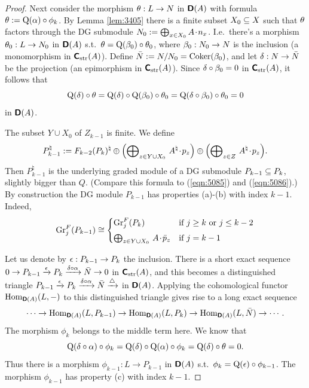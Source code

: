 \begin{proof}
Next consider the morphism
$\theta : L \to N$ in $\boldsymbol{\mathsf{D}}(A)$ with formula 
$\theta := \operatorname{Q}(\alpha) \circ \phi_k$.
By Lemma \ref{lem:3405} there is a finite subset $X_0 
\subseteq X$ such that $\theta$ factors through the DG submodule
$N_0 := \bigoplus\nolimits_{x \in X_0} A \mspace{1.5mu}{\cdot}\mspace{1.5mu} n_x$. 
I.e.\ there's a morphism $\theta_0 : L \to N_0$ in $\boldsymbol{\mathsf{D}}(A)$
s.t.\ $\theta = \operatorname{Q}(\beta_0) \circ \theta_0$, where 
$\beta_0 : N_0 \to N$ is the inclusion (a monomorphism in 
$\boldsymbol{\mathsf{C}}_{\mathrm{str}}(A)$). Define 
$\bar{N} := N / N_0 = \operatorname{Coker}(\beta_0)$,
and let $\delta : N \to \bar{N}$ be the projection
(an epimorphism in $\boldsymbol{\mathsf{C}}_{\mathrm{str}}(A)$). 
Since $\delta \circ \beta_0 = 0$ in $\boldsymbol{\mathsf{C}}_{\mathrm{str}}(A)$, 
it follows that 
\[ \operatorname{Q}(\delta) \circ \theta = \operatorname{Q}(\delta) \circ \operatorname{Q}(\beta_0) \circ \theta_0 = 
\operatorname{Q}(\delta \circ \beta_0) \circ \theta_0 = 0 \]
in $\boldsymbol{\mathsf{D}}(A)$. 

The subset $Y \cup X_0$ of $Z_{k - 1}$ is finite. 
We define 
\begin{equation} \label{eqn:3415}
P_{k - 1}^{\natural} := F_{k - 2}(P_k)^{\natural} \oplus
\Bigl( \bigoplus\nolimits_{z \in Y \cup X_0} \, A^{\natural}\mspace{1.5mu}{\cdot}\mspace{1.5mu} p_z \Bigr) 
\oplus \Bigl( \bigoplus\nolimits_{z \in Z} \, A^{\natural} \mspace{1.5mu}{\cdot}\mspace{1.5mu} p_z \Bigr) . 
\end{equation}
Then $P_{k - 1}^{\natural}$ is the underlying graded module of a DG submodule 
$P_{k - 1} \subseteq P_k$, slightly bigger than $Q$.
(Compare this formula to (\ref{eqn:5085}) and (\ref{eqn:5086}).)
By construction the DG module $P_{k - 1}$ has properties (a)-(b) 
with index $k - 1$. Indeed, 
\[ \operatorname{Gr}^F_j(P_{k - 1}) \cong 
\begin{cases}
\operatorname{Gr}^F_j(P_{k}) & \textup{if} \ j \geq k \ \textup{or} \ j \leq k - 2 
\\[0.4em]
\bigoplus\nolimits_{z \in Y \cup X_0} \, A \mspace{1.5mu}{\cdot}\mspace{1.5mu} \bar{p}_z 
& \textup{if} \ j = k - 1 
\end{cases} \]

Let us denote by $\epsilon : P_{k - 1} \to P_{k}$ the inclusion. 
There is a short exact sequence
$0 \to P_{k - 1} \xrightarrow{\epsilon} P_k \xrightarrow{\delta \circ \alpha} \bar{N} \to  0$
in $\boldsymbol{\mathsf{C}}_{\mathrm{str}}(A)$, and this becomes a distinguished triangle 
$P_{k - 1} \xrightarrow{\epsilon} P_k \xrightarrow{\delta \circ \alpha} \bar{N} \xrightarrow{\triangle}$
in $\boldsymbol{\mathsf{D}}(A)$. Applying the cohomological functor 
$\operatorname{Hom}_{\boldsymbol{\mathsf{D}}(A)}(L, -)$ to this distinguished triangle gives rise to a 
long exact sequence 
\[ \cdots \to \operatorname{Hom}_{\boldsymbol{\mathsf{D}}(A)}(L, P_{k - 1}) \to 
\operatorname{Hom}_{\boldsymbol{\mathsf{D}}(A)}(L, P_{k}) \to 
\operatorname{Hom}_{\boldsymbol{\mathsf{D}}(A)}(L, \bar{N}) \to \cdots . \]
The morphism $\phi_k$ belongs to the middle term here. 
We know that 
\[ \operatorname{Q}(\delta \circ \alpha) \circ \phi_k = 
\operatorname{Q}(\delta) \circ \operatorname{Q}(\alpha) \circ \phi_k = 
\operatorname{Q}(\delta) \circ \theta = 0 . \]
Thus there is a morphism 
$\phi_{k - 1} : L \to P_{k - 1}$
in $\boldsymbol{\mathsf{D}}(A)$ s.t.\ 
$\phi_k = \operatorname{Q}(\epsilon) \circ \phi_{k - 1}$. The morphism $\phi_{k - 1}$
has property (c) with index $k - 1$. 
\end{proof}

